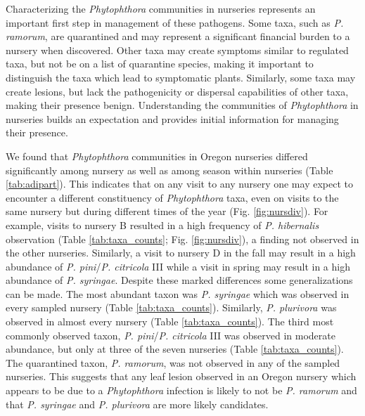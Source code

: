 \documentclass[12pt]{article}
\begin{document}
Characterizing the \emph{Phytophthora} communities in nurseries represents an important first step in management of these pathogens.  Some taxa, such as \emph{P. ramorum}, are quarantined and may represent a significant financial burden to a nursery when discovered.  Other taxa may create symptoms similar to regulated taxa, but not be on a list of quarantine species, making it important to distinguish the taxa which lead to symptomatic plants.  Similarly, some taxa may create lesions, but lack the pathogenicity or dispersal capabilities of other taxa, making their presence benign.  Understanding the communities of \emph{Phytophthora} in nurseries builds an expectation and provides initial information for managing their presence.

We found that \emph{Phytophthora} communities in Oregon nurseries differed significantly among nursery as well as among season within nurseries (Table \ref{tab:adipart}).  This indicates that on any visit to any nursery one may expect to encounter a different constituency of \emph{Phytophthora} taxa, even on visits to the same nursery but during different times of the year (Fig. \ref{fig:nursdiv}).  For example, visits to nursery B resulted in a high frequency of \emph{P. hibernalis} observation (Table \ref{tab:taxa_counts}; Fig. \ref{fig:nursdiv}), a finding not observed in the other nurseries.  Similarly, a visit to nursery D in the fall may result in a high abundance of \emph{P. pini}/\emph{P. citricola} III while a visit in spring may result in a high abundance of \emph{P. syringae}.  Despite these marked differences some generalizations can be made.  The most abundant taxon was \emph{P. syringae} which was observed in every sampled nursery (Table \ref{tab:taxa_counts}).  Similarly, \emph{P. plurivora} was observed in almost every nursery (Table \ref{tab:taxa_counts}).  The third most commonly observed taxon, \emph{P. pini}/\emph{P. citricola} III was observed in moderate abundance, but only at three of the seven nurseries (Table \ref{tab:taxa_counts}).  The quarantined taxon, \emph{P. ramorum}, was not observed in any of the sampled nurseries.  This suggests that any leaf lesion observed in an Oregon nursery which appears to be due to a \emph{Phytophthora} infection is likely to not be \emph{P. ramorum} and that \emph{P. syringae} and \emph{P. plurivora} are more likely candidates.

\end{document}
